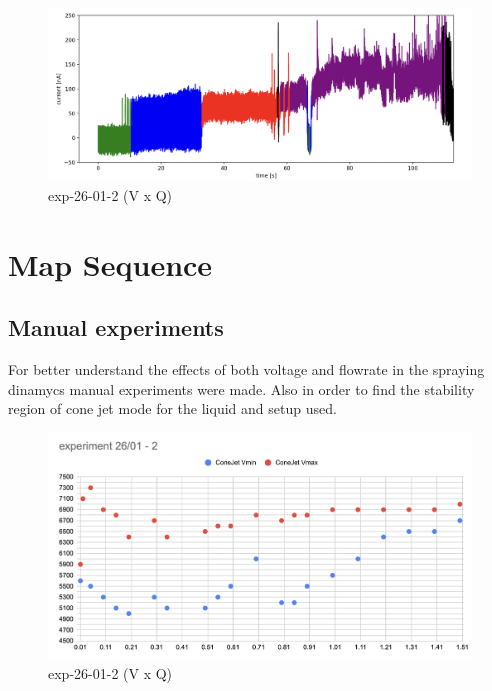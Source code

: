 \begin{figure}[H]
    \center
    \includegraphics[width=12cm]{Figuras/19:03/classified-data-example.png}
    \caption{ exp-26-01-2 (V x Q)}
\end{figure}


\section{Map Sequence}
\label{sec:map_results}



    \subsection{Manual experiments}


    For better understand the effects of both voltage and flowrate in the spraying dinamycs manual experiments were made.
    Also in order to find the stability region of cone jet mode for the liquid and setup used.



    \begin{figure}[H]
        \center
        \includegraphics[width=12cm]{Figuras/report3/exp26-01-2.png}
        \caption{ exp-26-01-2 (V x Q)}
    \end{figure}


